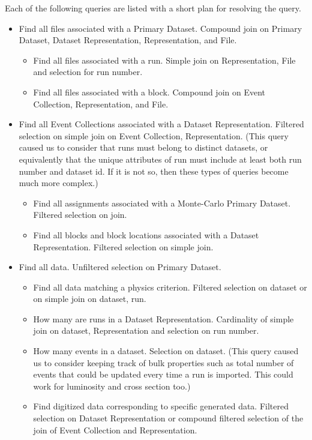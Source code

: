 \documentclass{cmspaper}
\begin{document}
Each of the following queries are listed with a short plan for resolving the query.

\begin{itemize}
\item Find all files associated with a Primary Dataset.  Compound join on Primary
Dataset, Dataset Representation, Representation, and File.
  \begin{itemize}
  \item Find all files associated with a run.  Simple join on Representation, File and selection for run number.
  \item Find all files associated with a block.  Compound join on Event Collection, Representation, 
and File.
  \end{itemize}
\item Find all Event Collections associated with a Dataset Representation.  Filtered selection on 
simple join on Event Collection, Representation. (This query caused us to consider that runs 
must belong to distinct datasets, or equivalently that the unique attributes of 
run must include at least both run number and dataset id.  If it is not so, then 
these types of queries become much more complex.)
  \begin{itemize}
  \item Find all assignments associated with a Monte-Carlo Primary Dataset. Filtered selection on join.
  \item Find all blocks and block locations associated with a Dataset Representation. Filtered selection 
  on simple join.
  \end{itemize}
\item Find all data. Unfiltered selection on Primary Dataset.
  \begin{itemize}
  \item Find all data matching a physics criterion.  Filtered selection on dataset or 
  on simple join on dataset, run.
  \item How many are runs in a Dataset Representation.  
Cardinality of simple join on dataset, Representation and selection on run number.
  \item How many events in a dataset.  Selection on dataset.  (This query caused us to 
  consider keeping track of bulk properties such as total number of events that could be 
  updated every time a run is imported.  This could work for luminosity and cross section too.)
  \item Find digitized data corresponding to specific generated data. 
  Filtered selection on Dataset Representation or compound filtered selection of the join of 
Event Collection and Representation.  
  \end{itemize}
\end{itemize}
\end{document}
